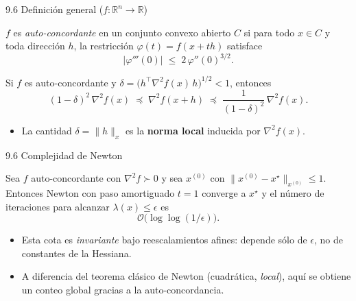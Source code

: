 \documentclass[10pt,aspectratio=169]{beamer}
\newcommand{\R}{\mathbb{R}}
\newcommand{\Hess}{\nabla^{2} f}
\begin{document}
\begin{frame}{9.6 Definición general ($f:\R^{n}\to\R$)}
  \begin{definition}[Auto-concordante en $\R^{n}$]
    $f$ es \emph{auto-concordante} en un conjunto convexo abierto $C$ si para todo
    $x \in C$ y toda dirección $h$, la restricción
    $\varphi(t) = f(x + t h)$ satisface
    \[
      |\varphi'''(0)| \;\le\; 2\, \varphi''(0)^{3/2}.
    \]
  \end{definition}
  \begin{theorem}
    Si $f$ es auto-concordante y $\delta = \bigl(h^{\top} \Hess(x)\, h\bigr)^{1/2} < 1$,
    entonces
    \[
      (1-\delta)^{2}\, \Hess(x) \;\preceq\; \Hess(x+h) \;\preceq\;
      \frac{1}{(1-\delta)^{2}}\, \Hess(x).
    \]
  \end{theorem}
  \begin{itemize}
    \item La cantidad $\delta = \|h\|_{x}$ es la \textbf{norma local} inducida por $\Hess(x)$.
  \end{itemize}
\end{frame}

\begin{frame}{9.6 Complejidad de Newton}
  \begin{theorem}
    Sea $f$ auto-concordante con $\Hess \succ 0$ y sea $x^{(0)}$ con
    $\|x^{(0)} - x^{\star}\|_{x^{(0)}} \le 1$. Entonces Newton con paso
    amortiguado $t = 1$ converge a $x^{\star}$ y el número de iteraciones
    para alcanzar $\lambda(x) \le \epsilon$ es
    \[
      \mathcal{O}\!\bigl(\log\log(1/\epsilon)\bigr).
    \]
  \end{theorem}
  \begin{itemize}
    \item Esta cota es \emph{invariante} bajo reescalamientos afines: depende sólo de
          $\epsilon$, no de constantes de la Hessiana.
    \item A diferencia del teorema clásico de Newton (cuadrática, \emph{local}), aquí
          se obtiene un conteo global gracias a la auto-concordancia.
  \end{itemize}
\end{frame}

\end{document}
